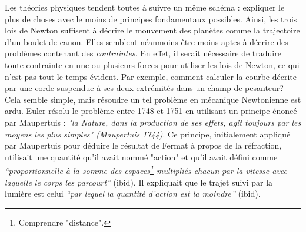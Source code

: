             Les théories physiques tendent toutes à suivre un même schéma : expliquer le plus de choses avec le moins de principes fondamentaux possibles. Ainsi, les trois lois de Newton suffisent à décrire le mouvement des planètes comme la trajectoire d'un boulet de canon. Elles semblent néanmoins être moins aptes à décrire des problèmes contenant des \textit{contraintes}. En effet, il serait nécessaire de traduire toute contrainte en une ou plusieurs forces pour utiliser les lois de Newton, ce qui n'est pas tout le temps évident. Par exemple, comment calculer la courbe décrite par une corde suspendue à ses deux extrémités dans un champ de pesanteur? Cela semble simple, mais résoudre un tel problème en mécanique Newtonienne est ardu. Euler résolu le problème entre 1748 et 1751 en utilisant un principe énoncé par Maupertuis : \textit{"la Nature, dans la production de ses effets, agit toujours par les moyens les plus simples" (Maupertuis 1744)}. Ce principe, initialement appliqué par Maupertuis pour déduire le résultat de Fermat à propos de la réfraction, utilisait une quantité qu'il avait nommé "action" et qu'il avait défini comme \textit{“proportionnelle à la somme des espaces\footnote{Comprendre "distance".} multipliés chacun par la vitesse avec laquelle le corps les parcourt”} (ibid). Il expliquait que le trajet suivi par la lumière est celui \textit{“par lequel la quantité d’action est la moindre”} (ibid).\\
                

